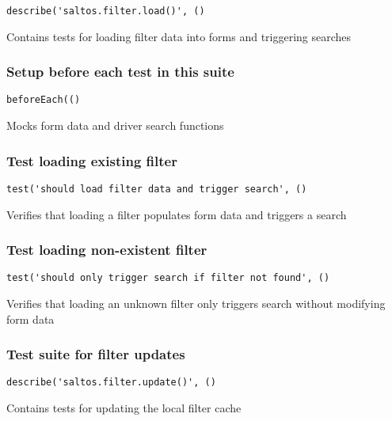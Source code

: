 \documentclass[a4paper]{article}
\begin{document}
\begin{lstlisting}
describe('saltos.filter.load()', ()
\end{lstlisting}

Contains tests for loading filter data into forms and triggering searches

\hypertarget{toc153}{}
\subsubsection{Setup before each test in this suite}

\begin{lstlisting}
beforeEach(()
\end{lstlisting}

Mocks form data and driver search functions

\hypertarget{toc154}{}
\subsubsection{Test loading existing filter}

\begin{lstlisting}
test('should load filter data and trigger search', ()
\end{lstlisting}

Verifies that loading a filter populates form data
and triggers a search

\hypertarget{toc155}{}
\subsubsection{Test loading non-existent filter}

\begin{lstlisting}
test('should only trigger search if filter not found', ()
\end{lstlisting}

Verifies that loading an unknown filter only triggers search
without modifying form data

\hypertarget{toc156}{}
\subsubsection{Test suite for filter updates}

\begin{lstlisting}
describe('saltos.filter.update()', ()
\end{lstlisting}

Contains tests for updating the local filter cache
\end{document}
